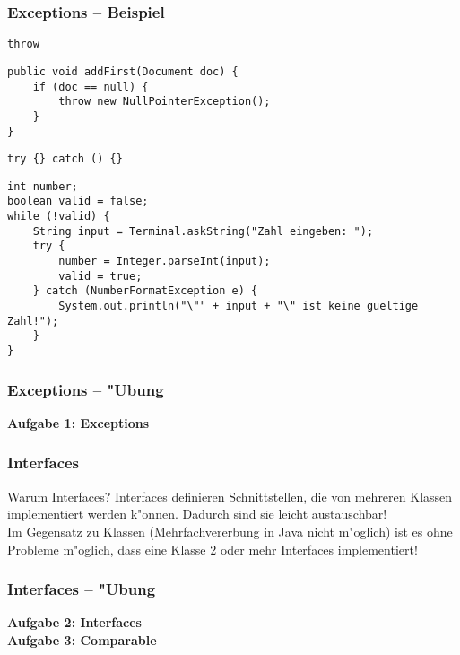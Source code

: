 \documentclass{beamer}
\begin{document}
\begin{frame}[containsverbatim]
\frametitle{Exceptions -- Beispiel}
\begin{block}{\texttt{throw}}
\begin{lstlisting}
public void addFirst(Document doc) {
	if (doc == null) {
		throw new NullPointerException();
	}
}
\end{lstlisting}
\end{block}

\begin{block}{\texttt{try \{\} catch () \{\}}}
\begin{lstlisting}
int number;
boolean valid = false;
while (!valid) {
	String input = Terminal.askString("Zahl eingeben: ");
	try {
		number = Integer.parseInt(input);
		valid = true;
	} catch (NumberFormatException e) {
		System.out.println("\"" + input + "\" ist keine gueltige Zahl!");
	}
}
\end{lstlisting}
\end{block}
\end{frame}


\begin{frame}
\frametitle{Exceptions -- "Ubung}
\begin{center}
\textbf{\Huge Aufgabe 1: Exceptions}
\end{center}
\end{frame}


\begin{frame}
\frametitle{Interfaces}
\begin{block}{Warum Interfaces?}
Interfaces definieren Schnittstellen, die von mehreren Klassen implementiert werden k"onnen. Dadurch sind sie leicht \alert{austauschbar}!\\\pause
Im Gegensatz zu Klassen (Mehrfachvererbung in Java nicht m"oglich) ist es ohne Probleme m"oglich, dass eine Klasse 2 oder mehr Interfaces implementiert!
\end{block}
\end{frame}


\begin{frame}
\frametitle{Interfaces -- "Ubung}
\begin{center}
\textbf{\Huge Aufgabe 2: Interfaces\\Aufgabe 3: Comparable}
\end{center}
\end{frame}
\end{document}
